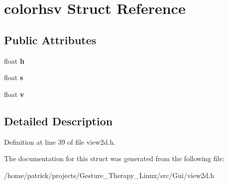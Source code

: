 \hypertarget{structcolorhsv}{}\section{colorhsv Struct Reference}
\label{structcolorhsv}
\subsection*{Public Attributes}
\begin{DoxyCompactItemize}
\item 
\mbox{\label{structcolorhsv_ae759d32fe78b79d1564c8b8cbaa68839}} 
float {\bfseries h}
\item 
\mbox{\label{structcolorhsv_acef1ddf3b3ef3cd359380d79f495c6ad}} 
float {\bfseries s}
\item 
\mbox{\label{structcolorhsv_ab8d6dc5205b78e1c68d150c3f5eb22d6}} 
float {\bfseries v}
\end{DoxyCompactItemize}


\subsection{Detailed Description}


Definition at line 39 of file view2d.\+h.



The documentation for this struct was generated from the following file\+:\begin{DoxyCompactItemize}
\item 
/home/patrick/projects/\+Gesture\+\_\+\+Therapy\+\_\+\+Linux/src/\+Gui/view2d.\+h\end{DoxyCompactItemize}
